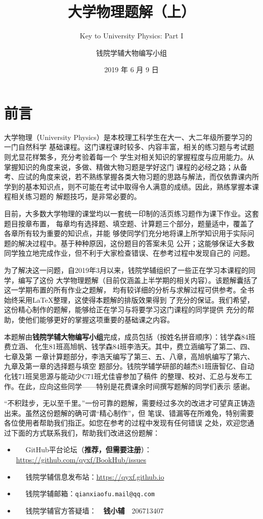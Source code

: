 \documentclass[b5paper,opensource,sourcefont,parskip]{qyxf-book}
\title{大学物理题解（上）}
\subtitle{Key to University Physics: Part I}
\author{钱院学辅大物编写小组}
\date{2019 年 6 月 9 日}
\begin{document}
\pagestyle{plain}
\chapter*{前言}
大学物理（University Physics）是本校理工科学生在大一、大二年级所要学习的一门自然科学
基础课程。这门课程课时较多、内容丰富，相关的练习题与考试题则尤显花样繁多，充分考验着每一个
学生对相关知识的掌握程度与应用能力。从掌握知识的角度来说，多做、精做大物习题是学好这门
课程的必经之路；从备考、应试的角度来说，若不熟练掌握各类大物习题的思路与解法，而仅依靠课内所
学到的基本知识点，则不可能在考试中取得令人满意的成绩。因此，熟练掌握本课程相关练习题的
解题技巧，是非常必要的。

目前，大多数大学物理的课堂均以一套统一印制的活页练习题作为课下作业。这套题目按章布置，
每章均有选择题、填空题、计算题三个部分，题量适中，覆盖了各章所有较为重要的知识点，并能
够使同学们充分地将课上所学知识用于实际问题的解决过程中。基于种种原因，这份题目的答案未见
公开；这能够保证大多数同学独立地完成作业，但不利于大家检查错误、在参考过程中发现自己的
问题。

为了解决这一问题，自2019年3月以来，钱院学辅组织了一些正在学习本课程的同学，编写了这份
大学物理题解（目前仅涵盖上半学期的相关内容）。该题解囊括了这一学期布置的所有作业之题解，
均有较详细的分析与求解过程可供参考。全书始终采用\LaTeX 整理，这使得本题解的排版效果得到
了充分的保证。我们希望，这份精心制作的题解，能够给正在学习与将要学习这门课程的同学提供
充分的帮助，使他们能够更好的掌握这项重要的基础课之内容。

本题解由\textbf{钱院学辅大物编写小组}完成，成员包括（按姓名拼音顺序）：钱学森84班费立涵、
化生81班高旭帆、钱学森84班李浩天。其中，费立涵编写了第二、四、七章及第
一章计算题部分，李浩天编写了第三、五、八章，高旭帆编写了第六、九章及第一章的选择题与填空
题部分。钱院学辅学研部的越杰81班唐智亿、自动化钱71班吴思源与能动少C71班尤佳睿参加了稿件
的整理、校对、汇总与发布工作。在此，应向这些同学——特别是花费课余时间撰写题解的同学们表示
感谢。

“不积跬步，无以至千里。”一份可靠的题解，需要经过多次的改进才可望真正铸造出来。虽然这份题解的确可谓“精心制作”，但
笔误、错漏等在所难免，特别需要各位使用者帮助我们指正。如您在参考的过程中发现有任何错误
之处，欢迎您通过下面的方式联系我们，帮助我们改进这份题解：
\begin{itemize}
	\item \faGithub ~~ GitHub平台论坛（\textbf{推荐，但需要注册}）：\url{https://github.com/qyxf/BookHub/issues}
	\item \faInternetExplorer ~~ 钱院学辅信息发布站：\url{https://qyxf.github.io}
	\item \faEnvelopeOpen ~~ 钱院学辅邮箱：\texttt{qianxiaofu.mail@qq.com}
	\item \faQq ~~ 钱院学辅官方答疑墙：~~\textbf{钱小辅}~~206713407
\end{itemize}
\end{document}
